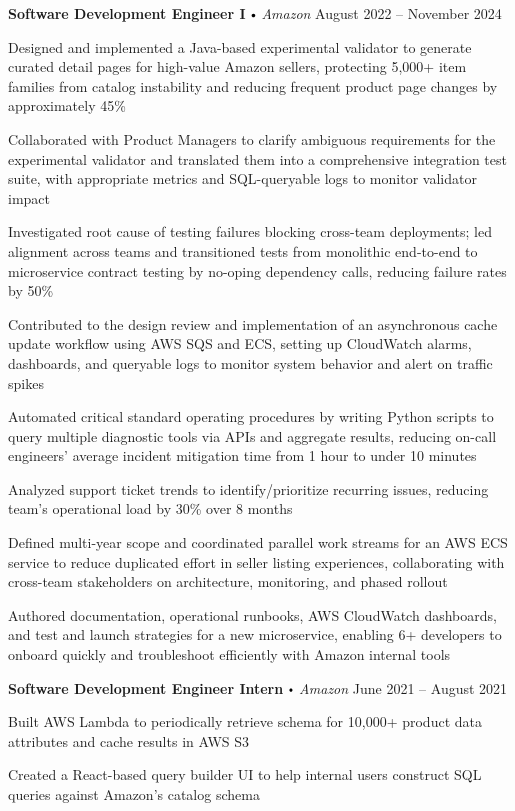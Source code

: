 \documentclass{article}
\newcommand{\employer}[4]{
\textbf{#1} \labelitemi \textit{#2} \hfill #3 \\ #4 \vspace*{3pt}
}
\renewcommand{\labelitemi}{
$\vcenter{\hbox{\tiny$\bullet$}}$\hspace*{3pt}
}
\renewcommand{\labelitemii}{
$\vcenter{\hbox{\tiny$\bullet$}}$\hspace*{-3pt}
}
\newenvironment{bullet-list-minor}{
\begin{list}{\labelitemii}{\setlength\leftmargin{15pt} 
\topsep 0pt \itemsep 1pt}}{\vspace*{4pt}\end{list}
}
\begin{document}
    \employer{Software Development Engineer I}{Amazon}{August 2022 -- November 2024}{}
    \smallskip
	\begin{bullet-list-minor}
        \item Designed and implemented a Java-based experimental validator to generate curated detail pages for high-value Amazon sellers, protecting 5,000+ item families from catalog instability and reducing frequent product page changes by approximately 45\%
        \item Collaborated with Product Managers to clarify ambiguous requirements for the experimental validator and translated them into a comprehensive integration test suite, with appropriate metrics and SQL-queryable logs to monitor validator impact
        \item Investigated root cause of testing failures blocking cross-team deployments; led alignment across teams and transitioned tests from monolithic end-to-end to microservice contract testing by no-oping dependency calls, reducing failure rates by 50\%
        \item Contributed to the design review and implementation of an asynchronous cache update workflow using AWS SQS and ECS, setting up CloudWatch alarms, dashboards, and queryable logs to monitor system behavior and alert on traffic spikes
        \item Automated critical standard operating procedures by writing Python scripts to query multiple diagnostic tools via APIs and aggregate results, reducing on-call engineers’ average incident mitigation time from 1 hour to under 10 minutes
        \item Analyzed support ticket trends to identify/prioritize recurring issues, reducing team’s operational load by 30\% over 8 months
        \item Defined multi-year scope and coordinated parallel work streams for an AWS ECS service to reduce duplicated effort in seller listing experiences, collaborating with cross-team stakeholders on architecture, monitoring, and phased rollout
        \item Authored  documentation, operational runbooks, AWS CloudWatch dashboards, and test and launch strategies for a new microservice, enabling 6+ developers to onboard quickly and troubleshoot efficiently with Amazon internal tools
    \end{bullet-list-minor}
    \medskip
    \smallskip
    
     \employer{Software Development Engineer Intern}{Amazon}{June  2021 -- August 2021}{}
    \smallskip
	\begin{bullet-list-minor}
	\item Built AWS Lambda to periodically retrieve schema for 10,000+ product data attributes and cache results in AWS S3
    \item Created a React-based query builder UI to help internal users construct SQL queries against Amazon’s catalog schema
    \end{bullet-list-minor}
    \bigskip
   
\end{document}
